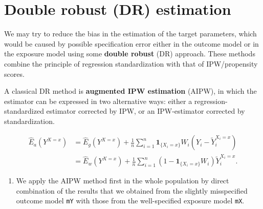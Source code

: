\documentclass[
]{book}
\newenvironment{Shaded}{\begin{snugshade}}{\end{snugshade}}
\newcommand{\DecValTok}[1]{\textcolor[rgb]{0.00,0.00,0.81}{#1}}
\newcommand{\FunctionTok}[1]{\textcolor[rgb]{0.13,0.29,0.53}{\textbf{#1}}}
\newcommand{\NormalTok}[1]{#1}
\newcommand{\OtherTok}[1]{\textcolor[rgb]{0.56,0.35,0.01}{#1}}
\newcommand{\SpecialCharTok}[1]{\textcolor[rgb]{0.81,0.36,0.00}{\textbf{#1}}}
\providecommand{\tightlist}{%
  \setlength{\itemsep}{0pt}\setlength{\parskip}{0pt}}
\begin{document}
\section{Double robust (DR) estimation}\label{double-robust-dr-estimation}

We may try to reduce the bias in the estimation of the target
parameters, which would be caused by possible specification error either
in the outcome model or in the exposure model using some
\textbf{double robust} (DR) approach. These methods combine the principle of
regression standardization with that of IPW/propensity scores.

A classical DR method is \textbf{augmented IPW estimation} (AIPW), in which the
estimator can be expressed in two alternative ways: either a
regression-standardized estimator corrected by IPW, or
an IPW-estimator corrected by standardization.

\[\begin{aligned}
 \widehat{E}_a(Y^{X=x}) 
       & = \widehat{E}_g(Y^{X=x}) +
\frac{1}{n} \sum_{i=1}^n  {\mathbf 1}_{\{X_i=x\}} W_i 
                   ( Y_i - \widetilde{Y}_i^{X_i=x} )   \\
       & = \widehat{E}_w(Y^{X=x}) +
\frac{1}{n} \sum_{i=1}^n ( 1 - {\mathbf 1}_{\{X_i=x\}} W_i ) 
                      \widetilde{Y}_i^{X_i=x}.
\end{aligned}\]

\begin{enumerate}
\def\labelenumi{\arabic{enumi}.}
\tightlist
\item
  We apply the AIPW method first in the whole population by direct
  combination of the results that we obtained from the slightly
  misspecified outcome model \texttt{mY} with those from the well-specified
  exposure model \texttt{mX}.
\end{enumerate}

\begin{Shaded}
\end{Shaded}
\end{document}
